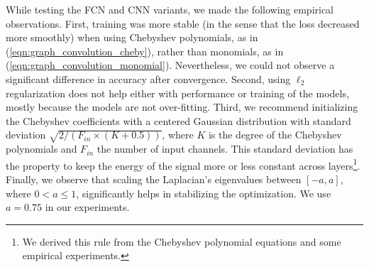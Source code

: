\documentclass[final,twocolumn,3p,times,sort&compress]{elsarticle}
\newcommand{\eqnref}[1]{(\ref{eqn:#1})}
\newcommand{\1}{\b{1}}              %
\newcommand{\0}{\b{0}}              %
\begin{document}
While testing the FCN and CNN variants, we made the following empirical observations.
First, training was more stable (in the sense that the loss decreased more smoothly) when using Chebyshev polynomials, as in \eqnref{graph_convolution_cheby}, rather than monomials, as in \eqnref{graph_convolution_monomial}.
Nevertheless, we could not observe a significant difference in accuracy after convergence.
Second, using $\ell_2$ regularization does not help either with performance or training of the models, mostly because the models are not over-fitting.
Third, we recommend initializing the Chebyshev coefficients with a centered Gaussian distribution with standard deviation $\sqrt{2/(F_{in} \times (K + 0.5))}$, where $K$ is the degree of the Chebyshev polynomials and $F_{in}$ the number of input channels. This standard deviation has the property to keep the energy of the signal more or less constant across layers\footnote{We derived this rule from the Chebyshev polynomial equations and some empirical experiments.}.
Finally, we observe that scaling the Laplacian's eigenvalues between $[-a, a]$, where $0 < a \leq 1$, significantly helps in stabilizing the optimization. We use $a = 0.75$ in our experiments.
\end{document}
